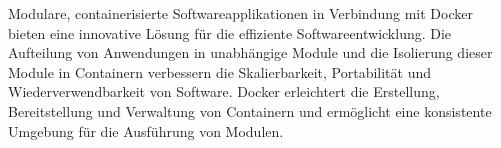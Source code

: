 Modulare, containerisierte Softwareapplikationen in Verbindung mit Docker bieten eine innovative Lösung für die effiziente Softwareentwicklung. Die Aufteilung von Anwendungen in unabhängige Module und die Isolierung dieser Module in Containern verbessern die Skalierbarkeit, Portabilität und Wiederverwendbarkeit von Software. Docker erleichtert die Erstellung, Bereitstellung und Verwaltung von Containern und ermöglicht eine konsistente Umgebung für die Ausführung von Modulen. 